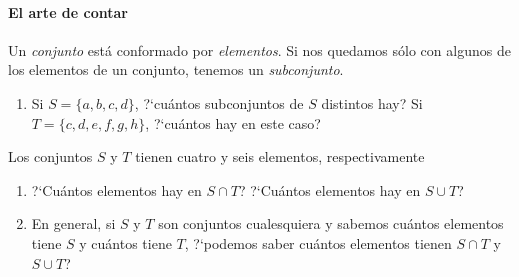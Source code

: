 \paragraph{El arte de contar}
Un \emph{conjunto} est\'a conformado por \emph{elementos}.
Si nos quedamos s\'olo con algunos de los elementos de un conjunto,
tenemos un \emph{subconjunto}.
\begin{enumerate}[label=P\arabic*]
	\conti
	\item\label{item:subconjuntos}
		Si $S=\{a,b,c,d\}$, ?`cu\'antos subconjuntos de
		$S$ distintos hay?
		Si $T=\{c,d,e,f,g,h\}$, ?`cu\'antos hay en este caso?
	\seti
\end{enumerate}
%
Los conjuntos $S$ y $T$ tienen cuatro y seis elementos, respectivamente
\begin{enumerate}[label=P\arabic*]
	\conti
	\item\label{item:conjuntos:operaciones}
		?`Cu\'antos elementos hay en $S\cap T$?
		?`Cu\'antos elementos hay en $S\cup T$?
	\item\label{item:conjuntos:operaciones:bis}
		En general, si $S$ y $T$ son conjuntos cualesquiera y
		sabemos cu\'antos elementos tiene $S$ y cu\'antos
		tiene $T$, ?`podemos saber cu\'antos elementos tienen
		$S\cap T$ y $S\cup T$?
\end{enumerate}
%

